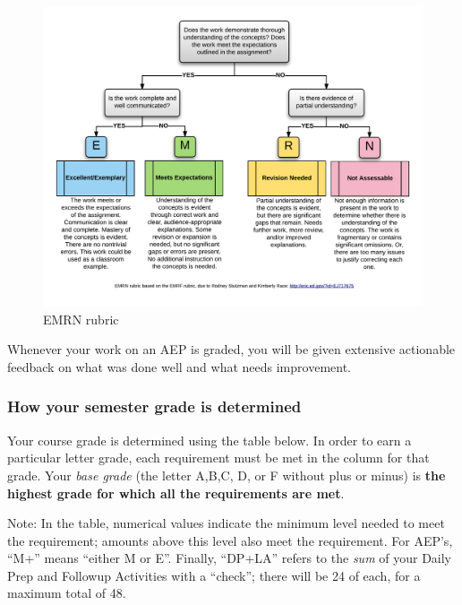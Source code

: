 \documentclass[]{article}
\begin{document}
\begin{figure}
\centering
\includegraphics{EMRN.png}
\caption{EMRN rubric}
\end{figure}

Whenever your work on an AEP is graded, you will be given extensive
actionable feedback on what was done well and what needs improvement.

\hypertarget{how-your-semester-grade-is-determined}{%
\subsubsection{How your semester grade is
determined}\label{how-your-semester-grade-is-determined}}

Your course grade is determined using the table below. In order to earn
a particular letter grade, each requirement must be met in the column
for that grade. Your \emph{base grade} (the letter A,B,C, D, or F
without plus or minus) is \textbf{the highest grade for which all the
requirements are met}.

Note: In the table, numerical values indicate the minimum level needed
to meet the requirement; amounts above this level also meet the
requirement. For AEP's, ``M+'' means ``either M or E''. Finally,
``DP+LA'' refers to the \emph{sum} of your Daily Prep and Followup
Activities with a ``check''; there will be 24 of each, for a maximum
total of 48.
\end{document}
